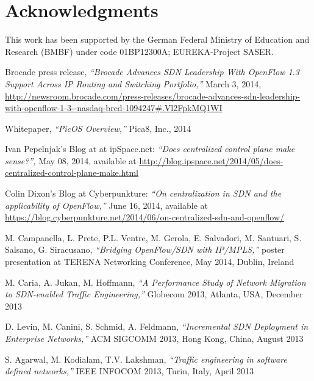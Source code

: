 \documentclass[journal]{IEEEtran}
\begin{document}
\section*{Acknowledgments}
This work has been supported by the German Federal Ministry of Education and Research (BMBF) under code 01BP12300A; EUREKA-Project SASER.











\begin{thebibliography}{1}

 Brocade press release, \emph{``Brocade Advances SDN Leadership With OpenFlow 1.3 Support Across IP Routing and Switching Portfolio,''} March 3, 2014, \url{http://newsroom.brocade.com/press-releases/brocade-advances-sdn-leadership-with-openflow-1-3--nasdaq-brcd-1094247#.Vl2FpkMQ1WI}

 Whitepaper, \emph{``PicOS Overview,''} Pica8, Inc., 2014

 Ivan Pepelnjak's Blog at at ipSpace.net: \emph{``Does centralized control plane make sense?'',} May 08, 2014, available at \url{http://blog.ipspace.net/2014/05/does-centralized-control-plane-make.html}

 Colin Dixon's Blog at Cyberpunkture: \emph{``On centralization in SDN and the applicability of OpenFlow,''} June 16, 2014, available at \url{https://blog.cyberpunkture.net/2014/06/on-centralized-sdn-and-openflow/}

 M. Campanella, L. Prete, P.L. Ventre, M. Gerola, E. Salvadori, M. Santuari, S. Salsano, G. Siracusano, \emph{``Bridging OpenFlow/SDN with IP/MPLS,''} poster presentation at TERENA Networking Conference, May 2014, Dublin, Ireland

 M. Caria, A. Jukan, M. Hoffmann, \emph{``A Performance Study of Network Migration to SDN-enabled Traffic Engineering,''} Globecom 2013, Atlanta, USA, December 2013

 D. Levin, M. Canini, S. Schmid, A. Feldmann, \emph{``Incremental SDN Deployment in Enterprise Networks,''} ACM SIGCOMM 2013, Hong Kong, China, August 2013

 S. Agarwal, M. Kodialam, T.V. Lakshman, \emph{``Traffic engineering in software defined networks,''} IEEE INFOCOM 2013, Turin, Italy, April 2013


\end{thebibliography}
\end{document}

